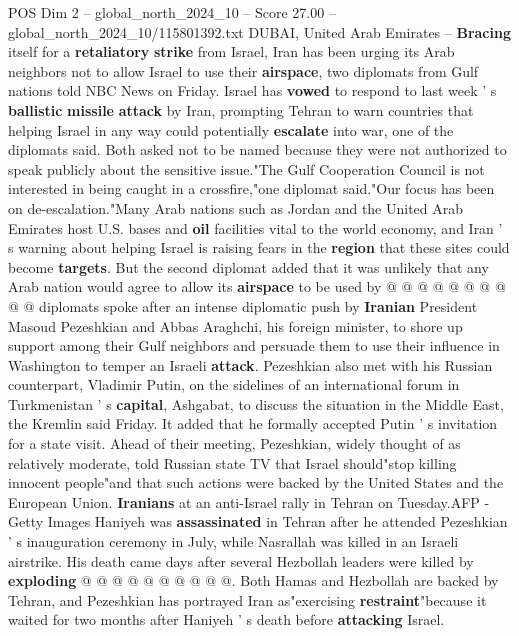 \begin{textsample}{POS Dim 2 – global\_north\_2024\_10 – Score 27.00 – global\_north\_2024\_10/115801392.txt}  \label{ex:f2_pos_077}
DUBAI, United Arab Emirates -- \textbf{Bracing} itself for a \textbf{retaliatory} \textbf{strike} from Israel, Iran has been urging its Arab neighbors not to allow Israel to use their \textbf{airspace}, two diplomats from Gulf nations told NBC News on Friday.
Israel has \textbf{vowed} to respond to last week ' s \textbf{ballistic} \textbf{missile} \textbf{attack} by Iran, prompting Tehran to warn countries that helping Israel in any way could potentially \textbf{escalate} into war, one of the diplomats said.
Both asked not to be named because they were not authorized to speak publicly about the sensitive issue."The Gulf Cooperation Council is not interested in being caught in a crossfire,"one diplomat said."Our focus has been on de-escalation."Many Arab nations such as Jordan and the United Arab Emirates host U.S. bases and \textbf{oil} facilities vital to the world economy, and Iran ' s warning about helping Israel is raising fears in the \textbf{region} that these sites could become \textbf{targets}.
But the second diplomat added that it was unlikely that any Arab nation would agree to allow its \textbf{airspace} to be used by @ @ @ @ @ @ @ @ @ @ diplomats spoke after an intense diplomatic push by \textbf{Iranian} President Masoud Pezeshkian and Abbas Araghchi, his foreign minister, to shore up support among their Gulf neighbors and persuade them to use their influence in Washington to temper an Israeli \textbf{attack}.
Pezeshkian also met with his Russian counterpart, Vladimir Putin, on the sidelines of an international forum in Turkmenistan ' s \textbf{capital}, Ashgabat, to discuss the situation in the Middle East, the Kremlin said Friday.
It added that he formally accepted Putin ' s invitation for a state visit.
Ahead of their meeting, Pezeshkian, widely thought of as relatively moderate, told Russian state TV that Israel should"stop killing innocent people"and that such actions were backed by the United States and the European Union. \textbf{Iranians} at an anti-Israel rally in Tehran on Tuesday.AFP - Getty Images Haniyeh was \textbf{assassinated} in Tehran after he attended Pezeshkian ' s inauguration ceremony in July, while Nasrallah was killed in an Israeli airstrike.
His death came days after several Hezbollah leaders were killed by \textbf{exploding} @ @ @ @ @ @ @ @ @ @.
Both Hamas and Hezbollah are backed by Tehran, and Pezeshkian has portrayed Iran as"exercising \textbf{restraint}"because it waited for two months after Haniyeh ' s death before \textbf{attacking} Israel.

\end{textsample}
